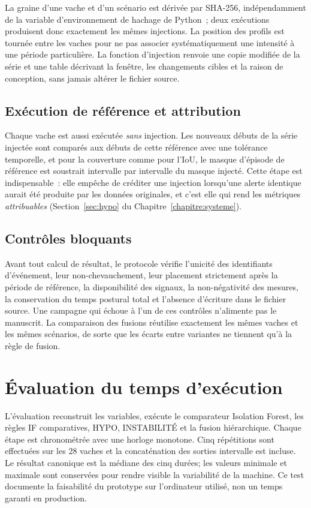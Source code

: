 La graine d'une vache et d'un scénario est dérivée par SHA-256, indépendamment de la
variable d'environnement de hachage de Python~; deux exécutions produisent donc exactement
les mêmes injections. La position des profils est tournée entre les vaches pour ne pas
associer systématiquement une intensité à une période particulière. La fonction
d'injection renvoie une copie modifiée de la série et une table décrivant la fenêtre, les
changements cibles et la raison de conception, sans jamais altérer le fichier source.

\subsection{Exécution de référence et attribution}

Chaque vache est aussi exécutée \emph{sans} injection. Les nouveaux débuts de la série
injectée sont comparés aux débuts de cette référence avec une tolérance temporelle, et pour
la couverture comme pour l'IoU, le masque d'épisode de référence est soustrait intervalle
par intervalle du masque injecté. Cette étape est indispensable~: elle empêche de créditer
une injection lorsqu'une alerte identique aurait été produite par les données originales, et
c'est elle qui rend les métriques \emph{attribuables} (Section~\ref{sec:hypo}
du Chapitre~\ref{chapitre:systeme}).

\subsection{Contrôles bloquants}

Avant tout calcul de résultat, le protocole vérifie l'unicité des identifiants d'événement,
leur non-chevauchement, leur placement strictement après la période de référence, la disponibilité des
signaux, la non-négativité des mesures, la conservation du temps postural total et l'absence
d'écriture dans le fichier source. Une campagne qui échoue à l'un de ces contrôles
n'alimente pas le manuscrit. La comparaison des fusions réutilise exactement les mêmes
vaches et les mêmes scénarios, de sorte que les écarts entre variantes ne tiennent qu'à la
règle de fusion.

\section{Évaluation du temps d'exécution}

L'évaluation reconstruit les variables, exécute le comparateur Isolation Forest, les règles
IF comparatives, HYPO, INSTABILITÉ et la fusion hiérarchique. Chaque étape est chronométrée avec
une horloge monotone. Cinq répétitions sont effectuées sur les 28 vaches et la concaténation
des sorties intervalle est incluse. Le résultat canonique est la médiane des cinq durées; les
valeurs minimale et maximale sont conservées pour rendre visible la variabilité de la machine.
Ce test documente la faisabilité du prototype sur l'ordinateur utilisé, non un temps garanti
en production.

